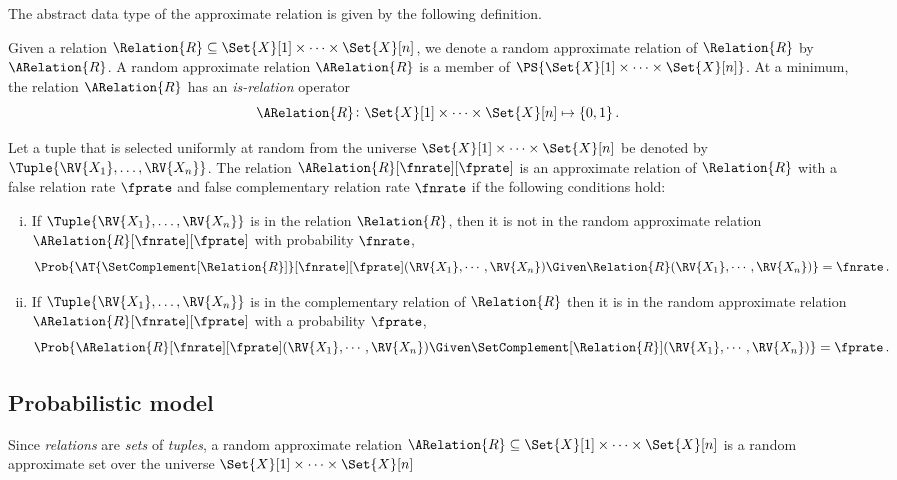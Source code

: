 \documentclass[ ../main.tex]{subfiles}
\begin{document}
The abstract data type of the approximate relation is given by the following definition.
\begin{definition}
\label{def:approx_rel}
Given a relation $\Relation{R} \subseteq \Set{X}[1] \times \cdots \times 
\Set{X}[n]$, we denote a random approximate relation of $\Relation{R}$ by $\ARelation{R}$.
A random approximate relation $\ARelation{R}$ is a member of $\PS{\Set{X}[1] \times 
\cdots \times \Set{X}[n]}$.
At a minimum, the relation $\ARelation{R}$ has an \emph{is-relation} operator
\begin{equation}
    \ARelation{R} \colon \Set{X}[1] \times \cdots \times \Set{X}[n] \mapsto \{ 
    0, 1 \}\,.
\end{equation}

Let a tuple that is selected uniformly at random from the universe $\Set{X}[1] 
\times \cdots \times \Set{X}[n]$ be denoted by $\Tuple{\RV{X_1}, \ldots, 
\RV{X_n}}$.
The relation $\ARelation{R}[\fnrate][\fprate]$ is an approximate relation of $\Relation{R}$ 
with a false relation rate $\fprate$ and false complementary relation rate 
$\fnrate$ if the following conditions hold:
\begin{enumerate}[(i)]
    \item If $\Tuple{\RV{X_1}, \ldots, \RV{X_n}}$ is in the relation $\Relation{R}$, then it is not in the random approximate relation $\ARelation{R}[\fnrate][\fprate]$ with probability $\fnrate$,
    \begin{equation}
        \Prob{\AT{\SetComplement[\Relation{R}]}[\fnrate][\fprate](\RV{X_1}, \cdots, \RV{X_n}) \Given 
        \Relation{R}(\RV{X_1}, \cdots, \RV{X_n})} = \fnrate\,.
    \end{equation}
    
    \item If $\Tuple{\RV{X_1}, \ldots, \RV{X_n}}$ is in the complementary relation of $\Relation{R}$ then it is in the random approximate relation $\ARelation{R}[\fnrate][\fprate]$ with a probability $\fprate$,
    \begin{equation}
        \Prob{\ARelation{R}[\fnrate][\fprate](\RV{X_1}, \cdots, \RV{X_n}) \Given \SetComplement[\Relation{R}](\RV{X_1}, \cdots, \RV{X_n})} = \fprate\,.
    \end{equation}
\end{enumerate}
\end{definition}

\subsection{Probabilistic model}
\label{sec:prob_model}
Since \emph{relations} are \emph{sets} of \emph{tuples}, a random approximate relation $\ARelation{R} \subseteq \Set{X}[1] \times \cdots \times \Set{X}[n]$ is a random approximate set\cite{aset} over the universe $\Set{X}[1] \times \cdots \times \Set{X}[n]$
\end{document}
